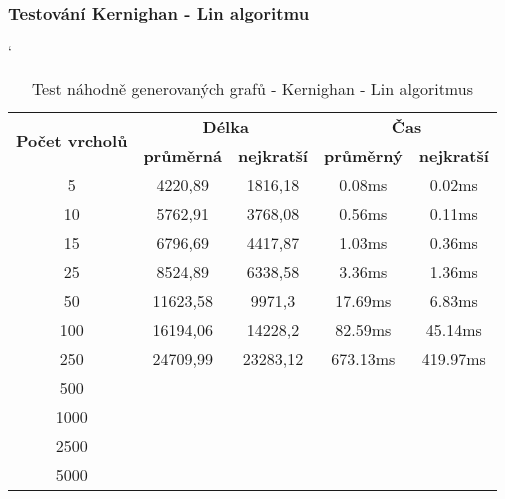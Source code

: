 \documentclass[
  printversion=false,
  joinlists=true,
  glossaries=true,
  figures=true,
  tables=true,
  sourcecodes=false,
  theorems=false,
  bibencoding=utf8,
  language=czech,
  encoding=utf8,
  program=infpvs,
  index=true,
  biblatex=true
]{kidiplom}
\begin{document}
\subsubsection{Testování Kernighan - Lin algoritmu}

\begin{table}[H]
\catcode`
\centering
\begin{tabular}{|c|c|c|c|c|}
\hline
\multirow{2}{*}{\textbf{Počet vrcholů}} & \multicolumn{2}{c|}{\textbf{Délka}}                                              & \multicolumn{2}{c|}{\textbf{Čas}} \\ \cline{2-5}
& \textbf{průměrná} & \textbf{nejkratší} & \textbf{průměrný} & \textbf{nejkratší} \\
\hline
5                      & 4220,89                 & 1816,18                  & 0.08ms                & 0.02ms                 \\
10                     & 5762,91                 & 3768,08                  & 0.56ms                & 0.11ms                 \\
15                     & 6796,69                 & 4417,87                  & 1.03ms                & 0.36ms                 \\
25                     & 8524,89                 & 6338,58                  & 3.36ms                & 1.36ms                 \\
50                     & 11623,58                & 9971,3                   & 17.69ms               & 6.83ms                 \\
100                    & 16194,06                & 14228,2                  & 82.59ms               & 45.14ms                \\
250                    & 24709,99                & 23283,12                 & 673.13ms              & 419.97ms               \\
500                    &                         &                          &                       &                        \\
1000                   &                         &                          &                       &                        \\
2500                   &                         &                          &                       &                        \\
5000                   &                         &                          &                       &                        \\ \hline
\end{tabular}
\caption{Test náhodně generovaných grafů - Kernighan - Lin algoritmus}
\end{table}
\end{document}
